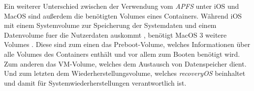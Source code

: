 Ein weiterer Unterschied zwischen der Verwendung vom \textit{APFS} unter iOS und
MacOS sind außerdem die benötigten Volumes eines Containers.  Während iOS mit
einem Systemvolume zur Speicherung der Systemdaten und einem Datenvolume fuer
die Nutzerdaten auskommt \cite[S. 49]{apple2020}, benötigt MacOS 3 weitere
Volumes \cite[S. 48]{apple2020}. Diese sind zum einen das Preboot-Volume,
welches Informationen über alle Volumes des Containers enthält und vor allem zum
Booten benötigt wird. Zum anderen das VM-Volume, welches dem Austausch von
Datenspeicher dient. Und zum letzten dem Wiederherstellungsvolume, welches
\textit{recoveryOS} beinhaltet und damit für Systemwiederherstellungen
verantwortlich ist.
